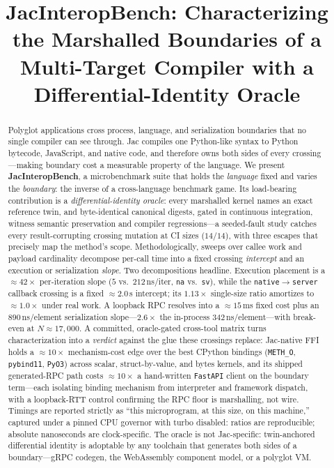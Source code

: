 \documentclass[conference]{IEEEtran}
\newcommand{\code}[1]{\texttt{#1}}
\begin{document}
\title{JacInteropBench: Characterizing the Marshalled Boundaries of a
Multi-Target Compiler with a Differential-Identity Oracle}

\author{
}

\maketitle

\begin{abstract}
Polyglot applications cross process, language, and serialization boundaries
that no single compiler can see through. Jac compiles one Python-like syntax to
Python bytecode, JavaScript, and native code, and therefore owns both sides of
every crossing---making boundary cost a measurable property of the language. We
present \textbf{JacInteropBench}, a microbenchmark suite that holds the
\emph{language} fixed and varies the \emph{boundary}: the inverse of a
cross-language benchmark game. Its load-bearing contribution is a
\emph{differential-identity oracle}: every marshalled kernel names an exact
reference twin, and byte-identical canonical digests, gated in continuous
integration, witness semantic preservation and compiler regressions---a
seeded-fault study catches every result-corrupting crossing mutation at CI sizes
($14/14$), with three escapes that precisely map the method's scope.
Methodologically, sweeps over callee work and payload cardinality decompose
per-call time into a fixed crossing \emph{intercept} and an execution or
serialization \emph{slope}. Two decompositions headline. Execution placement is
a $\approx$$42\times$ per-iteration slope ($5$ vs.\ $212$\,ns/iter, \code{na}
vs.\ \code{sv}), while the \code{native$\rightarrow$server} callback crossing
is a fixed $\approx$$2.0$\,\textmu s intercept; its $1.13\times$ single-size
ratio amortizes to $\approx$$1.0\times$ under real work. A loopback RPC
resolves into a $\approx$$15$\,ms fixed cost plus an $890$\,ns/element
serialization slope---$2.6\times$ the in-process $342$\,ns/element---with
break-even at $N\approx17{,}000$. A committed, oracle-gated cross-tool matrix
turns characterization into a \emph{verdict} against the glue these crossings
replace: Jac-native FFI holds a $\approx$$10\times$ mechanism-cost edge over the
best CPython bindings (\code{METH\_O}, \code{pybind11}, \code{PyO3}) across
scalar, struct-by-value, and bytes kernels, and its shipped generated-RPC path
costs $\approx$$10\times$ a hand-written \code{FastAPI} client on the boundary
term---each isolating binding mechanism from interpreter and framework dispatch,
with a loopback-RTT control confirming the RPC floor is marshalling, not wire.
Timings are reported strictly as ``this
microprogram, at this size, on this machine,'' captured under a pinned CPU
governor with turbo disabled: ratios are reproducible; absolute nanoseconds are
clock-specific. The oracle is not Jac-specific: twin-anchored differential
identity is adoptable by any toolchain that generates both sides of a
boundary---gRPC codegen, the WebAssembly component model, or a polyglot VM.
\end{abstract}
\end{document}
